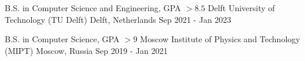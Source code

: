 

\begin{cventries}

  \cventry
    {B.S. in Computer Science and Engineering, GPA $> 8.5$} %
    {Delft University of Technology (TU Delft)} %
    {Delft, Netherlands} %
    {Sep 2021 - Jan 2023} %
    {
    }

  \vspace{-0.4cm}
  \cventry
    {B.S. in Computer Science, GPA $> 9$} %
    {Moscow Institute of Physics and Technology (MIPT)} %
    {Moscow, Russia} %
    {Sep 2019 - Jan 2021} %
    {
    }
  \vspace{-0.5cm}
\end{cventries}
